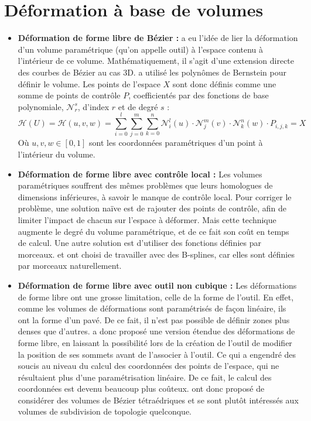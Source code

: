 \section{Déformation à base de volumes}
\begin{itemize}
\item{\textbf{Déformation de forme libre de Bézier :}} \cite{SP86} a
  eu l'idée de lier la déformation d'un volume paramétrique (qu'on
  appelle outil) à l'espace contenu à l'intérieur de ce
  volume. Mathématiquement, il s'agit d'une extension directe des
  courbes de Bézier au cas 3D. \cite{SP86} a utilisé les polynômes de
  Bernstein pour définir le volume. Les points de l'espace $X$ sont
  donc définis comme une somme de points de contrôle $P$,
  coefficientés par des fonctions de base polynomiale,
  $\mathcal{N}_r^s$, d'index $r$ et de degré $s$ :
  \begin{equation}
    \mathcal{H}(U) = \mathcal{H}(u,v,w) = 
    \sum_{i=0}^l \sum_{j=0}^m \sum_{k=0}^n
    \mathcal{N}_i^l(u) \cdot \mathcal{N}_j^m(v) \cdot \mathcal{N}_k^n(w) \cdot P_{i,j,k} = X
  \end{equation}
  Où $u,v,w \in [0,1]$ sont les coordonnées paramétriques d'un point à
  l'intérieur du volume.
\item{\textbf{Déformation de forme libre avec contrôle local :}} Les
  volumes paramétriques souffrent des mêmes problèmes que leurs
  homologues de dimensions inférieures, à savoir le manque de contrôle
  local. Pour corriger le problème, une solution naïve est de rajouter
  des points de contrôle, afin de limiter l'impact de chacun sur
  l'espace à déformer. Mais cette technique augmente le degré du
  volume paramétrique, et de ce fait son coût en temps de calcul. Une
  autre solution est d'utiliser des fonctions définies par
  morceaux. \cite{GP89} et \cite{Com89} ont choisi de travailler avec
  des B-splines, car elles sont définies par morceaux naturellement.
\item{\textbf{Déformation de forme libre avec outil non cubique :}}
  Les déformations de forme libre ont une grosse limitation, celle de
  la forme de l'outil. En effet, comme les volumes de déformations
  sont paramétrisés de façon linéaire, ils ont la forme d'un pavé. De
  ce fait, il n'est pas possible de définir zones plus denses que
  d'autres. \cite{Coq90} a donc proposé une version étendue des
  déformations de forme libre, en laissant la possibilité lors de la
  création de l'outil de modifier la position de ses sommets avant de
  l'associer à l'outil. Ce qui a engendré des soucis au niveau du
  calcul des coordonnées des points de l'espace, qui ne résultaient
  plus d'une paramétrisation linéaire. De ce fait, le calcul des
  coordonnées est devenu beaucoup plus coûteux. \cite{BBT97} ont donc
  proposé de considérer des volumes de Bézier tétraédriques et
  \cite{MJ96} se sont plutôt intéressés aux volumes de subdivision de
  topologie quelconque.
\end{itemize}


